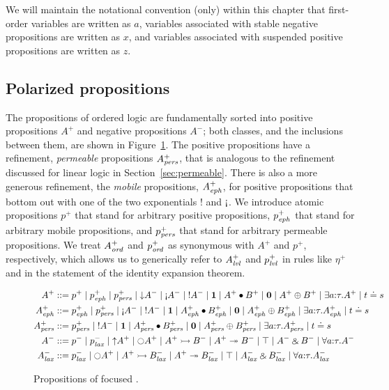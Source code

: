 We will maintain the notational convention (only) within this chapter that
first-order variables are written as $a$, variables associated
with stable negative propositions are written as $x$, and variables
associated with suspended positive propositions are written as 
$z$.

\subsection{Polarized propositions}
\label{sec:ordpolarprop}

The propositions of ordered logic are fundamentally sorted into
positive propositions $A^+$ and negative propositions $A^-$; both
classes, and the inclusions between them, 
are shown in Figure~\ref{fig:ordered}. The
positive propositions have a refinement, {\it permeable} propositions
$A^+_{\it pers}$, that is analogous to the refinement discussed for linear
logic in Section~\ref{sec:permeable}. There is also a more generous
refinement, the {\it mobile} propositions, $A^+_{\it eph}$, for positive
propositions that bottom out with one of the two exponentials ${!}$ and
${\gnab}$. We introduce atomic propositions $p^+$ that stand for
arbitrary positive propositions, $p^+_{\it eph}$ that stand for arbitrary
mobile propositions, and $p^+_{\it pers}$ that stand for arbitrary
permeable propositions. We treat $A^+_{\it ord}$ and $p^+_{\it ord}$ as synonymous
with $A^+$ and $p^+$, respectively, which allows us to generically
refer to $A^+_{\it lvl}$ and $p^+_{\it lvl}$ in rules like $\eta^+$ and in the
statement of the identity expansion theorem.

\begin{figure}
\begin{align*}
A^+ & ::= p^+ \mid p^+_\meph \mid p^+_\mpers
        \mid {\downarrow}A^- \mid {\gnab}A^- \mid {!}A^- 
        \mid \one \mid A^+ \fuse B^+ \mid \zero \mid A^+ \oplus B^+ 
        \mid \exists a{:}\tau. A^+ \mid t \doteq s
\\
A^+_\meph & ::= p^+_\meph \mid p^+_\mpers
        \mid {\gnab}A^- \mid {!}A^- 
        \mid \one \mid A^+_\meph \fuse B^+_\meph
        \mid \zero \mid A^+_\meph \oplus B^+_\meph
        \mid \exists a{:}\tau. A^+_\meph \mid t \doteq s
\\
A^+_\mpers & ::= p^+_\mpers 
        \mid {!}A^- 
        \mid \one \mid A^+_\mpers \fuse B^+_\mpers 
        \mid \zero \mid A^+_\mpers \oplus B^+_\mpers
        \mid \exists a{:}\tau. A^+_\mpers \mid t \doteq s
\\
A^- & ::= p^- \mid p^-_\mlax 
        \mid {\uparrow}A^+ \mid {\ocircle}A^+
        \mid A^+ \lefti B^- \mid A^+ \righti B^-
        \mid \top \mid A^- \with B^-
        \mid \forall a{:}\tau.A^-
\\
A^-_\mlax & ::= p^-_\mlax 
        \mid {\ocircle}A^+
        \mid A^+ \lefti B^-_\mlax \mid A^+ \righti B^-_\mlax
        \mid \top \mid A^-_\mlax \with B^-_\mlax
        \mid \forall a{:}\tau.A^-_\mlax
\end{align*}
\caption{Propositions of focused \ollll.}
\label{fig:ordered}
\end{figure}

